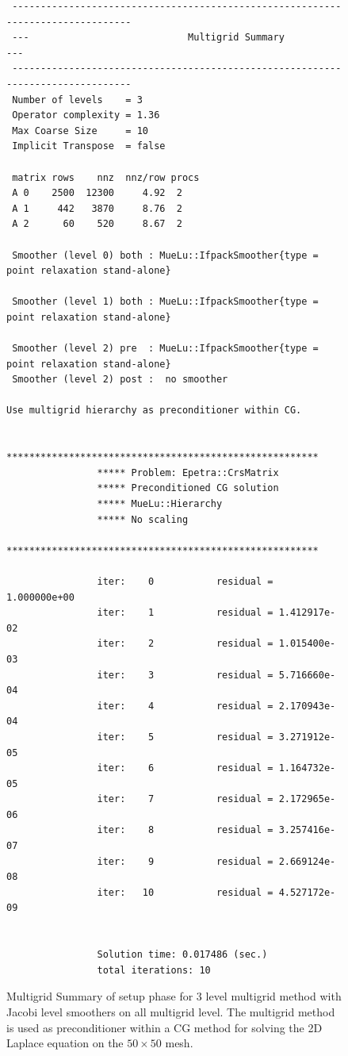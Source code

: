\documentclass[12pt,a4paper]{article}
\begin{document}
\begin{figure}
\tiny
\begin{minipage}{\textwidth}
\begin{verbatim}
 --------------------------------------------------------------------------------
 ---                            Multigrid Summary                             ---
 --------------------------------------------------------------------------------
 Number of levels    = 3
 Operator complexity = 1.36
 Max Coarse Size     = 10
 Implicit Transpose  = false

 matrix rows    nnz  nnz/row procs
 A 0    2500  12300     4.92  2
 A 1     442   3870     8.76  2
 A 2      60    520     8.67  2

 Smoother (level 0) both : MueLu::IfpackSmoother{type = point relaxation stand-alone}

 Smoother (level 1) both : MueLu::IfpackSmoother{type = point relaxation stand-alone}

 Smoother (level 2) pre  : MueLu::IfpackSmoother{type = point relaxation stand-alone}
 Smoother (level 2) post :  no smoother

Use multigrid hierarchy as preconditioner within CG.

                *******************************************************
                ***** Problem: Epetra::CrsMatrix
                ***** Preconditioned CG solution
                ***** MueLu::Hierarchy
                ***** No scaling
                *******************************************************

                iter:    0           residual = 1.000000e+00
                iter:    1           residual = 1.412917e-02
                iter:    2           residual = 1.015400e-03
                iter:    3           residual = 5.716660e-04
                iter:    4           residual = 2.170943e-04
                iter:    5           residual = 3.271912e-05
                iter:    6           residual = 1.164732e-05
                iter:    7           residual = 2.172965e-06
                iter:    8           residual = 3.257416e-07
                iter:    9           residual = 2.669124e-08
                iter:   10           residual = 4.527172e-09


                Solution time: 0.017486 (sec.)
                total iterations: 10
\end{verbatim}
\end{minipage}
\caption{Multigrid Summary of setup phase for 3 level multigrid method with Jacobi level smoothers on all multigrid level. The multigrid method is used as preconditioner within a CG method for solving the 2D Laplace equation on the $50\times 50$ mesh.}
\label{fig:jacobisolver}
\end{figure}
\end{document}
